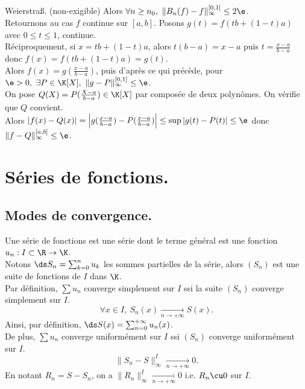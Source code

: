 \documentclass[11pt]{article}
\begin{document}
\begin{thm}{Weierstraß. (non-exigible)}{}
    Alors $\forall n \geq n_0, ~ \|B_n(f)-f\|_\infty^{[0,1]}\leq2\e$.\\
    Retournons au cas $f$ continue sur $[a,b]$. Posons $g(t)=f(tb+(1-t)a)$ avec $0\leq t \leq 1$, continue.\\
    Réciproquement, si $x=tb+(1-t)a$, alors $t(b-a)=x-a$ puis $t=\frac{x-a}{b-a}$ donc $f(x)=f(tb+(1-t)a)=g(t)$.\\
    Alors $f(x)=g(\frac{x-a}{b-a})$, puis d'après ce qui précède, pour $\e >0, ~ \exists P \in \K[X], ~ \|g-P\|_\infty^{[0,1]}\leq\e$.\\
    On pose $Q(X)=P(\frac{X-a}{b-a})\in\K[X]$ par composée de deux polynômes. On vérifie que $Q$ convient.\\
    Alors $\left|f(x)-Q(x)\right|=\left|g(\frac{x-a}{b-a})-P(\frac{x-a}{b-a})\right|\leq\sup|g(t)-P(t)|\leq\e$ donc $\|f-Q\|_\infty^{[a,b]}\leq\e$. 
\end{thm}

\section{Séries de fonctions.}

\subsection{Modes de convergence.}

\begin{defi}{}{}
    Une série de fonctions est une série dont le terme général est une fonction $u_n:I\subset\R\to\K$.\\
    Notons $\ds S_n = \sum_{k=0}^nu_k$ les sommes partielles de la série, alors $(S_n)$ est une suite de fonctions de $I$ dans $\K$.\\
    Par définition, $\sum u_n$ converge simplement sur $I$ ssi la suite $(S_n)$ converge simplement sur $I$.
    \begin{equation*}
        \forall x \in I, ~ S_n(x) \xrightarrow[n\to+\infty]{} S(x). 
    \end{equation*} 
    Ainsi, par définition, $\ds S(x)=\sum_{n=0}^{+\infty}u_n(x)$.\\
    De plus, $\sum u_n$ converge uniformément sur $I$ ssi $(S_n)$ converge uniformément sur $I$.
    \begin{equation*}
        \|S_n-S\|_\infty^I \xrightarrow[n\to+\infty]{}0.
    \end{equation*}
    En notant $R_n=S - S_n$, on a $\|R_n\|_\infty^I \xrightarrow[n\to+\infty]{}0$ i.e. $R_n\cu 0$ sur $I$.
\end{defi}
\end{document}
